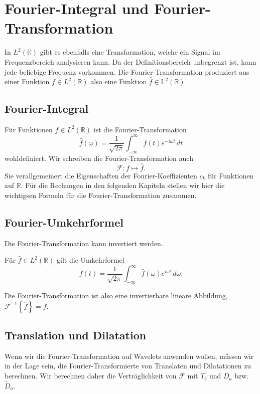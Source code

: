 %
%
%
\section{Fourier-Integral und Fourier-Transformation
\label{section:fourier-integral}}
In $L^2(\mathbb R)$ gibt es ebenfalls eine Transformation, welche
ein Signal im Frequenzbereich analysieren kann.
Da der Definitionsbereich unbegrenzt ist, kann jede beliebige Frequenz
vorkommen.
Die Fourier-Transformation produziert aus einer Funktion $f\in L^2(\mathbb R)$
also eine Funktion $\hat{f}\in\mathbb L^2(\mathbb R)$.

\subsection{Fourier-Integral
\label{subsection:fourier-integral}}
Für Funktionen $f\in L^2(\mathbb R)$ ist die Fourier-Transformation
\[
\hat{f}(\omega)
=
\frac{1}{\sqrt{2\pi}}
\int_{-\infty}^\infty f(t) e^{-i\omega t}\,dt
\]
wohldefiniert.
Wir schreiben die Fourier-Transformation auch
\[
\mathcal{F}\colon f\mapsto \hat{f}.
\]
Sie verallgemeinert die Eigenschaften der Fourier-Koeffizienten $c_k$
für Funktionen auf $\mathbb R$.
Für die Rechungen in den folgenden Kapiteln stellen wir hier die
wichtigsen Formeln für die Fourier-Transformation zusammen.

\subsection{Fourier-Umkehrformel
\label{subsection:fourier-umkehrformel}}
Die Fourier-Transformation kann invertiert werden.

\begin{satz}
Für $\hat{f}\in L^2(\mathbb R)$ gilt die Umkehrformel
\[
f(t)
=
\frac{1}{\sqrt{2\pi}}
\int_{-\infty}^{\infty} \hat{f}(\omega)e^{i\omega t}\,d\omega.
\]
\end{satz}

Die Fourier-Transformation ist also eine invertierbare lineare Abbildung,
$\mathcal{F}^{-1}\!\left\lbrace\hat{f}\right\rbrace = f$.

\subsection{Translation und Dilatation
\label{subsection:ft-translation-und-dilatation}}
Wenn wir die Fourier-Transformation auf Wavelets anwenden wollen, müssen
wir in der Lage sein, die Fourier-Transformierte von Translaten und
Dilatationen zu berechnen.
Wir berechnen daher die Verträglichkeit von $\mathcal{F}$ mit $T_b$ und
$D_a$ bzw.~$\tilde{D}_a$.

